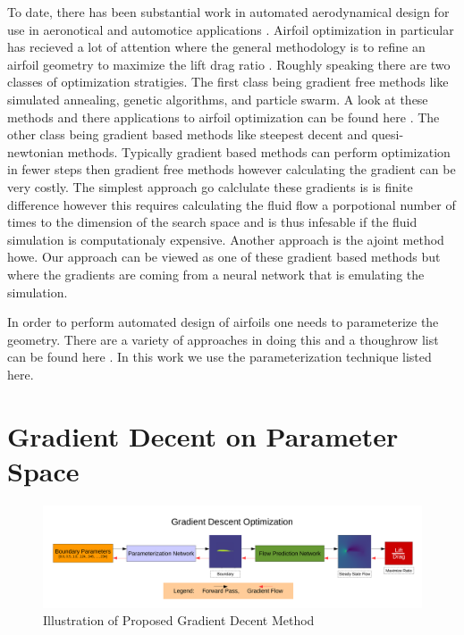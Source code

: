 \documentclass{article} %
\begin{document}
To date, there has been substantial work in automated aerodynamical design for use in aeronotical and automotice applications \cite{ando2010automotive} \cite{demultiplexer}. Airfoil optimization in particular has recieved a lot of attention where the general methodology is to refine an airfoil geometry to maximize the lift drag ratio \cite{drela1998pros}. Roughly speaking there are two classes of optimization stratigies. The first class being gradient free methods like simulated annealing, genetic algorithms, and particle swarm. A look at these methods and there applications to airfoil optimization can be found here \cite{mukesh2012application}. The other class being gradient based methods like steepest decent and quesi-newtonian methods. Typically gradient based methods can perform optimization in fewer steps then gradient free methods however calculating the gradient can be very costly. The simplest approach go calclulate these gradients is is finite difference however this requires calculating the fluid flow a porpotional number of times to the dimension of the search space and is thus infesable if the fluid simulation is computationaly expensive. Another approach is the ajoint method howe. Our approach can be viewed as one of these gradient based methods but where the gradients are coming from a neural network that is emulating the simulation.

In order to perform automated design of airfoils one needs to parameterize the geometry. There are a variety of approaches in doing this and a thoughrow list can be found here \cite{salunke2014airfoil}. In this work we use the parameterization technique listed here.

\section{Gradient Decent on Parameter Space}

\begin{figure}[h]
\begin{center}
\includegraphics[scale=0.34]{./gradient_descent_optimization.pdf}
\end{center}
\caption{Illustration of Proposed Gradient Decent Method}
\end{figure}
\end{document}
